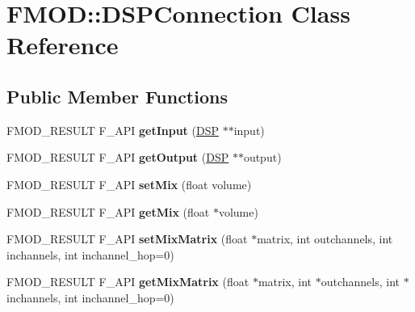 \hypertarget{class_f_m_o_d_1_1_d_s_p_connection}{\section{F\+M\+O\+D\+:\+:D\+S\+P\+Connection Class Reference}
\label{class_f_m_o_d_1_1_d_s_p_connection}
}
\subsection*{Public Member Functions}
\begin{DoxyCompactItemize}
\item 
\hypertarget{class_f_m_o_d_1_1_d_s_p_connection_a4885524212e3f791debfac1ec259ee6a}{F\+M\+O\+D\+\_\+\+R\+E\+S\+U\+L\+T F\+\_\+\+A\+P\+I {\bfseries get\+Input} (\hyperlink{class_f_m_o_d_1_1_d_s_p}{D\+S\+P} $\ast$$\ast$input)}\label{class_f_m_o_d_1_1_d_s_p_connection_a4885524212e3f791debfac1ec259ee6a}

\item 
\hypertarget{class_f_m_o_d_1_1_d_s_p_connection_a813e7b67af3dcf1fad6b8ed73ad99a8d}{F\+M\+O\+D\+\_\+\+R\+E\+S\+U\+L\+T F\+\_\+\+A\+P\+I {\bfseries get\+Output} (\hyperlink{class_f_m_o_d_1_1_d_s_p}{D\+S\+P} $\ast$$\ast$output)}\label{class_f_m_o_d_1_1_d_s_p_connection_a813e7b67af3dcf1fad6b8ed73ad99a8d}

\item 
\hypertarget{class_f_m_o_d_1_1_d_s_p_connection_a67b8373d3bead0903909ac035acfa47d}{F\+M\+O\+D\+\_\+\+R\+E\+S\+U\+L\+T F\+\_\+\+A\+P\+I {\bfseries set\+Mix} (float volume)}\label{class_f_m_o_d_1_1_d_s_p_connection_a67b8373d3bead0903909ac035acfa47d}

\item 
\hypertarget{class_f_m_o_d_1_1_d_s_p_connection_a21bceb2d4e9d4f951c137d7a2bc95572}{F\+M\+O\+D\+\_\+\+R\+E\+S\+U\+L\+T F\+\_\+\+A\+P\+I {\bfseries get\+Mix} (float $\ast$volume)}\label{class_f_m_o_d_1_1_d_s_p_connection_a21bceb2d4e9d4f951c137d7a2bc95572}

\item 
\hypertarget{class_f_m_o_d_1_1_d_s_p_connection_ace26b82a7ab3795e80a28e913d2125f2}{F\+M\+O\+D\+\_\+\+R\+E\+S\+U\+L\+T F\+\_\+\+A\+P\+I {\bfseries set\+Mix\+Matrix} (float $\ast$matrix, int outchannels, int inchannels, int inchannel\+\_\+hop=0)}\label{class_f_m_o_d_1_1_d_s_p_connection_ace26b82a7ab3795e80a28e913d2125f2}

\item 
\hypertarget{class_f_m_o_d_1_1_d_s_p_connection_ab374698ec55adfc99a92b915f3d588f0}{F\+M\+O\+D\+\_\+\+R\+E\+S\+U\+L\+T F\+\_\+\+A\+P\+I {\bfseries get\+Mix\+Matrix} (float $\ast$matrix, int $\ast$outchannels, int $\ast$inchannels, int inchannel\+\_\+hop=0)}\label{class_f_m_o_d_1_1_d_s_p_connection_ab374698ec55adfc99a92b915f3d588f0}


\end{DoxyCompactItemize}
